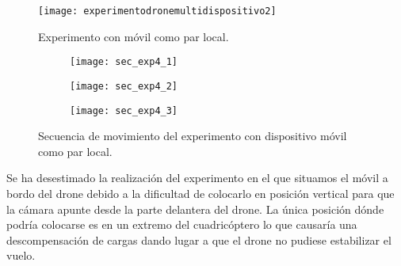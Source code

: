 \begin{figure}[h!]
\centering
\texttt{[image: experimentodronemultidispositivo2]}
\caption{Experimento con móvil como par local.}
\label{fig:experimentodronemultidispositivo2}
\end{figure}


\begin{figure}[h!]
\centering
  \begin{subfigure}[]{48mm}
    \texttt{[image: sec\_exp4\_1]}
  \end{subfigure}
  \hspace{1pt}
  \begin{subfigure}[]{48mm}
    \texttt{[image: sec\_exp4\_2]}
  \end{subfigure}
    \hspace{1pt}
    \begin{subfigure}[]{48mm}
    \texttt{[image: sec\_exp4\_3]}
  \end{subfigure}
    \caption{Secuencia de movimiento del experimento con dispositivo móvil como par local.}
  \label{fig:secexp4}
\end{figure}

Se ha desestimado la realización del experimento en el que situamos el móvil a bordo del drone debido a la dificultad de colocarlo en posición vertical para que la cámara apunte desde la parte delantera del drone. La única posición dónde podría colocarse es en un extremo del cuadricóptero lo que causaría una descompensación de cargas dando lugar a que el drone no pudiese estabilizar el vuelo.\\

